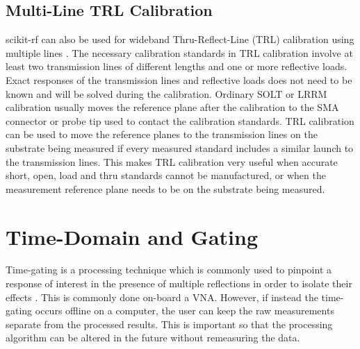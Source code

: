 \documentclass[10pt, letterpaper]{scrartcl}
\newcommand{\skrf}{{s}cikit-rf\xspace}
\begin{document}

\subsection{Multi-Line TRL Calibration}
\skrf{} can also be used for wideband Thru-Reflect-Line (TRL) calibration using multiple lines \cite{marks1991}. The necessary calibration standards in TRL calibration involve at least two transmission lines of different lengths and one or more reflective loads. Exact responses of the transmission lines and reflective loads does not need to be known and will be solved during the calibration. Ordinary SOLT or LRRM \cite{davidson1990} calibration usually moves the reference plane after the calibration to the SMA connector or probe tip used to contact the calibration standards. TRL calibration can be used to move the reference planes to the transmission lines on the substrate being measured if every measured standard includes a similar launch to the transmission lines. This makes TRL calibration very useful when accurate short, open, load and thru standards cannot be manufactured, or when the measurement reference plane needs to be on the substrate being measured. 

\section{Time-Domain and Gating}
Time-gating is a processing technique which is commonly used to pinpoint a response of interest in the presence of multiple reflections in order to isolate their effects \cite{cronson1973, bennett1978}. This is commonly done on-board a VNA. However, if instead the time-gating occurs offline on a computer, the user can keep the raw measurements separate from the processed results. This is important so that the processing algorithm can be altered in the future without remeasuring the data. 
\end{document}
